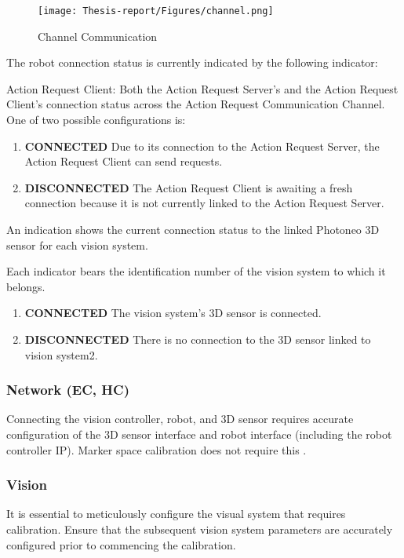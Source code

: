 \documentclass[12pt]{article}
\begin{document}
\begin{figure}[h]
    \centering
    \texttt{[image: Thesis-report/Figures/channel.png]}
    \caption{Channel Communication \cite{ref2}}
    \label{fig:Photoneo Camera}
\end{figure}

The robot connection status is currently indicated by the following indicator:

 Action Request Client: Both the Action Request Server's and the Action Request Client's connection status across the Action Request Communication Channel.  One of two possible configurations is: \cite{ref2}
 \begin{enumerate}
     \item  \textbf{CONNECTED} Due to its connection to the Action Request Server, the Action Request Client can send requests\cite{ref2}.
      \item   \textbf{DISCONNECTED} The Action Request Client is awaiting a fresh connection because it is not currently linked to the Action Request Server\cite{ref2}.

 \end{enumerate}

An indication shows the current connection status to the linked Photoneo 3D sensor for each vision system.

Each indicator bears the identification number of the vision system to which it belongs.
  \newpage
  \begin{enumerate}
  \item  \textbf{CONNECTED} The vision system's 3D sensor is connected.
  \item   \textbf{DISCONNECTED}  There is no connection to the 3D sensor linked to vision system2.
 \end{enumerate}

\subsubsection{Network (EC, HC)}
Connecting the vision controller, robot, and 3D sensor requires accurate configuration of the 3D sensor interface and robot interface (including the robot controller IP).  Marker space calibration does not require this \cite {ref2}.
\subsubsection{Vision }
It is essential to meticulously configure the visual system that requires calibration.  Ensure that the subsequent vision system parameters are accurately configured prior to commencing the calibration.
\end{document}
